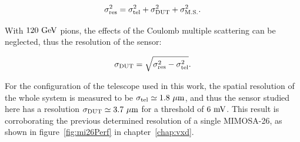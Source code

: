       \begin{equation}
        \sigma_{\rm{res}}^2 = \sigma_{\rm{tel}}^2 + \sigma_{\rm{DUT}}^2 + \sigma_{\rm{M.S.}}^2.
        \label{eq:pointingResolution}
      \end{equation}

      With $120~\rm{GeV}$ pions, the effects of the Coulomb multiple scattering can be neglected, thus the resolution of the sensor:

      \begin{equation}
        \sigma_{\rm{DUT}} = \sqrt{\sigma_{\rm{res}}^2 - \sigma_{\rm{tel}}^2}.
      \end{equation}

      For the configuration of the telescope used in this work, the spatial resolution of the whole system is measured to be $\sigma_{\rm{tel}} \simeq 1.8~\rm{\mu m}$, and thus the sensor studied here has a resolution $\sigma_{\rm{DUT}} \simeq 3.7~\rm{\mu m}$ for a threshold of $6~\rm{mV}$.
      This result is corroborating the previous determined resolution of a single MIMOSA-26, as shown in figure~\ref{fig:mi26Perf} in chapter~\ref{chap:vxd}.

